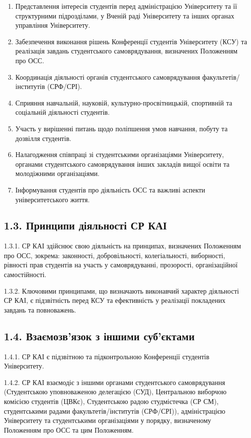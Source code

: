         \begin{enumerate}[label=\alph*)]
            \item Представлення інтересів студентів перед адміністрацією Університету та її структурними підрозділами, у Вченій раді Університету та інших органах управління Університету.
            \item Забезпечення виконання рішень Конференції студентів Університету (КСУ) та реалізація завдань студентського самоврядування, визначених Положенням про ОСС.
            \item Координація діяльності органів студентського самоврядування факультетів/інститутів (СРФ/СРІ).
            \item Сприяння навчальній, науковій, культурно-просвітницькій, спортивній та соціальній діяльності студентів.
            \item Участь у вирішенні питань щодо поліпшення умов навчання, побуту та дозвілля студентів.
            \item Налагодження співпраці зі студентськими організаціями Університету, органами студентського самоврядування інших закладів вищої освіти та молодіжними організаціями.
            \item Інформування студентів про діяльність ОСС та важливі аспекти університетського життя.
        \end{enumerate}

\subsection*{1.3. Принципи діяльності СР КАІ}
    1.3.1. СР КАІ здійснює свою діяльність на принципах, визначених Положенням про ОСС, зокрема: законності, добровільності, колегіальності, виборності, рівності прав студентів на участь у самоврядуванні, прозорості, організаційної самостійності.

    1.3.2. Ключовими принципами, що визначають виконавчий характер діяльності СР КАІ, є підзвітність перед КСУ та ефективність у реалізації покладених завдань та повноважень.

\subsection*{1.4. Взаємозв'язок з іншими суб'єктами}
    1.4.1. СР КАІ є підзвітною та підконтрольною Конференції студентів Університету.

    1.4.2. СР КАІ взаємодіє з іншими органами студентського самоврядування (Студентською уповноваженою делегацією (СУД), Центральною виборчою комісією студентів (ЦВКс), Студентською радою студмістечка (СР СМ), студентськими радами факультетів/інститутів (СРФ/СРІ)), адміністрацією Університету та студентськими організаціями у порядку, визначеному Положенням про ОСС та цим Положенням. 